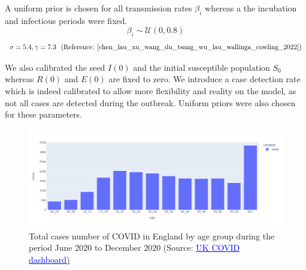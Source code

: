 \documentclass[nonatbib,preprint,12pt,authoryear]{elsarticle}
\begin{document}
A uniform prior is chosen for all transmission rates $\beta_i$ whereas a the incubation and infectious periods were fixed.
$$\beta_i \sim \mathcal{U}(0,0.8)$$
$$\sigma  = 5.4 , \gamma = 7.3~~\text{(Reference: \cite{chen_lau_xu_wang_du_tsang_wu_lau_wallinga_cowling_2022})}$$

We also calibrated the seed $I(0)$ and the initial susceptible population $S_0$ whereas $R(0)$ and $E(0)$ are fixed to zero.
We introduce a case detection rate which is indeed calibrated to allow more flexibility and reality on the model, as not all cases are detected during the outbreak. Uniform priors were also chosen for these parameters.

\begin{figure}[H]
    \centering
    \includegraphics[width=\linewidth]{Figures/Model_2/England_covid_total_cases_08-to-12-2020.png}
    \caption{Total cases number of COVID in England by age group during the period June $2020$ to December $2020$ (Source: \href{https://ukhsa-dashboard.data.gov.uk/covid-19-archive-data-download}{\textcolor{blue}{UK COVID dashboard}) } }
    \label{fig:total_case_UK}
\end{figure}
\end{document}

